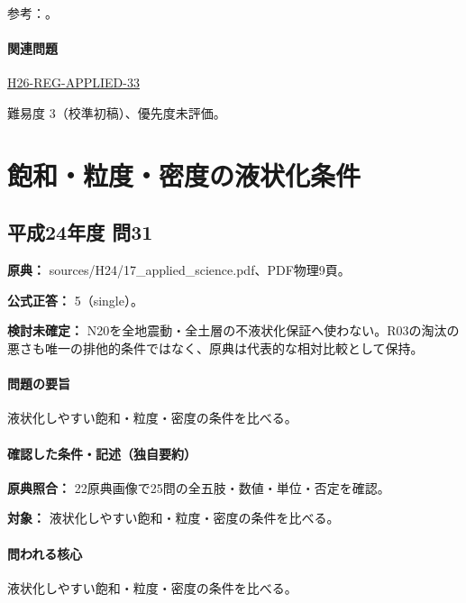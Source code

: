 \par 参考：\cite{eng52_slip_weaklayer,eng52_landslide_ref}。

\paragraph{関連問題} \hyperref[q:h26-reg-applied-33]{H26-REG-APPLIED-33}

\par 難易度 3（校準初稿）、優先度未評価。

\section{飽和・粒度・密度の液状化条件}

\subsection{平成24年度 問31}
\label{q:h24-reg-applied-31}

\noindent\textbf{原典：} sources/H24/17\_applied\_science.pdf、PDF物理9頁。

\textbf{公式正答：} 5（single）。

\par\textbf{検討未確定：} N20を全地震動・全土層の不液状化保証へ使わない。R03の淘汰の悪さも唯一の排他的条件ではなく、原典は代表的な相対比較として保持。

\paragraph{問題の要旨} 液状化しやすい飽和・粒度・密度の条件を比べる。

\paragraph{確認した条件・記述（独自要約）}\mbox{}\par

\noindent\textbf{原典照合：} 22原典画像で25問の全五肢・数値・単位・否定を確認。\par

\noindent\textbf{対象：} 液状化しやすい飽和・粒度・密度の条件を比べる。\par

\paragraph{問われる核心} 液状化しやすい飽和・粒度・密度の条件を比べる。

